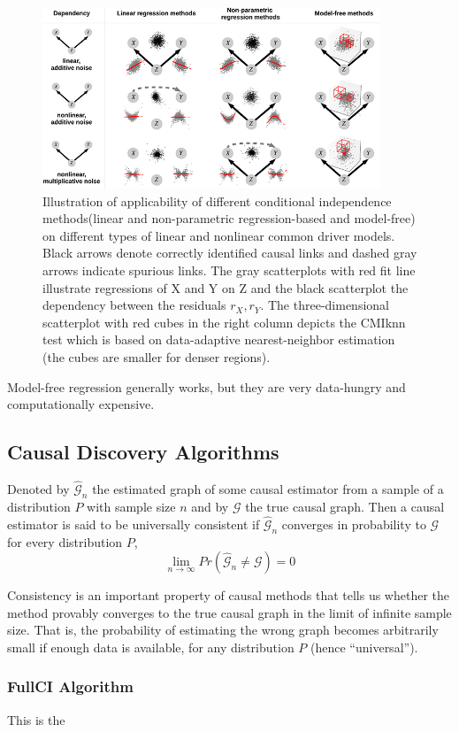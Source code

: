 \begin{figure}[H]
    \includegraphics[width=0.9\textwidth]{img/depfunc.jpeg}
    \centering
    \caption{Illustration of applicability of different conditional independence methods(linear and non-parametric
    regression-based and model-free) on different types of linear and nonlinear common driver models. Black arrows 
    denote correctly identified causal links and dashed gray arrows indicate spurious links. The gray scatterplots 
    with red fit line illustrate regressions of X and Y on Z and the black scatterplot the dependency between the 
    residuals $r_X,r_Y$. The three-dimensional scatterplot with red cubes in the right column depicts the CMIknn test 
    which is based on data-adaptive nearest-neighbor estimation (the cubes are smaller for denser regions).}
\end{figure}

Model-free regression generally works, but they are very data-hungry and computationally expensive.

\subsection{Causal Discovery Algorithms}
\begin{tcolorbox}[colback=red!5!white,colframe=red!75!black,title=\textbf{Universal causal consistency Definition}]
Denoted by $\mathcal{\hat{G}}_n$ the estimated graph of some causal estimator from a sample of a 
distribution $P$ with sample size $n$ and by $\mathcal{G}$ the true causal graph. 
Then a causal estimator is said to be universally consistent if $\hat{\mathcal{G}}_n$ 
converges in probability to $\mathcal{G}$ for every distribution $P$,
\begin{equation*}
    \lim_{n\rightarrow\infty} Pr(\hat{\mathcal{G}}_n\ne\mathcal{G})=0
\end{equation*}
\end{tcolorbox}
Consistency is an important property of causal methods that tells us whether the method provably 
converges to the true causal graph in the limit of infinite sample size. That is, the probability of estimating 
the wrong graph becomes arbitrarily small if enough data is available, for any distribution $P$ (hence “universal”).

\subsubsection{FullCI Algorithm}
This is the